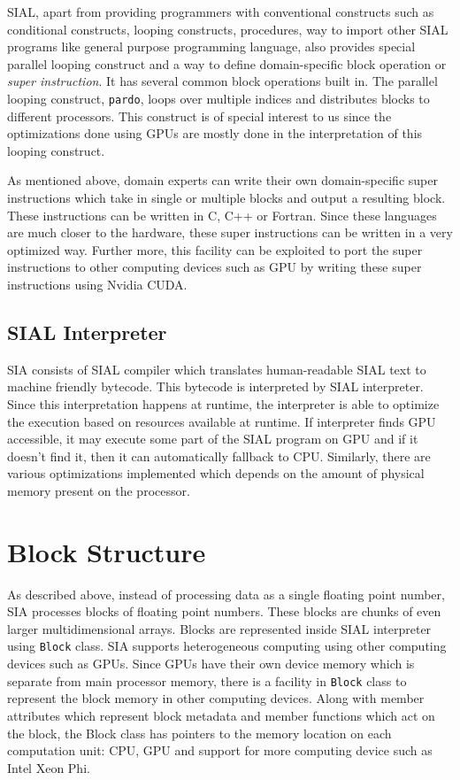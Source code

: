 SIAL, apart from providing programmers with conventional constructs such as
conditional constructs, looping constructs, procedures, way to import other SIAL
programs like general purpose programming language, also provides special parallel looping construct and a way
to define domain-specific block operation or \textit{super instruction}. It
has several common block operations built in. The
parallel looping construct, \texttt{pardo}, loops over multiple indices and
distributes blocks to different processors. This construct is of special
interest to us since the optimizations done using GPUs are mostly done in the
interpretation of this looping construct.

As mentioned above, domain experts can write their own domain-specific
super instructions which take in single or multiple blocks and output a resulting block. These
instructions can be written in C, C++ or Fortran. Since these languages are much
closer to the hardware, these super instructions can be written in a very
optimized way. Further more, this facility can be exploited to port the super instructions to
other computing devices such as GPU by writing these super instructions using
Nvidia CUDA.

\subsection{SIAL Interpreter}
SIA consists of SIAL compiler which translates human-readable SIAL text to
machine friendly bytecode. This bytecode is interpreted by SIAL interpreter.
Since this interpretation happens at runtime, the interpreter is able to optimize the
execution based on resources available at runtime. If interpreter finds GPU
accessible, it may execute some part of the SIAL program on GPU and if it
doesn't find it, then it can automatically fallback to CPU. Similarly, there are
various optimizations implemented which depends on the amount of physical memory
present on the processor.

\section{Block Structure}
As described above, instead of processing data as a single floating point
number, SIA processes blocks of floating point numbers. These blocks are chunks
of even larger multidimensional arrays. Blocks are represented inside SIAL
interpreter using \texttt{Block} class. SIA supports heterogeneous computing
using other computing devices such as GPUs. Since GPUs have their own device memory
which is separate from main processor memory, there is a facility in
\texttt{Block} class to represent the block memory in other
computing devices. Along with member attributes which represent block metadata
and member functions which act on the block, the Block class has pointers to
the memory location on each computation unit: CPU, GPU and support for more
computing device such as Intel Xeon Phi.

